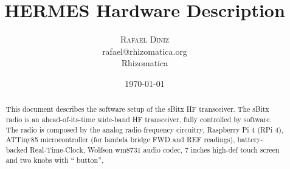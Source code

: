 \documentclass[11pt,a4paper]{article}
\title{HERMES Hardware Description}
\author{
       \large
        \textsc{Rafael Diniz}
        \mbox{}\\ %
        rafael@rhizomatica.org\\
        \mbox{Rhizomatica} \\ %
}
\date{\today}
\begin{document}
\maketitle

\begin{abstract}
  This document describes the software setup of the sBitx HF transceiver.
  The sBitx radio is an ahead-of-its-time wide-band HF transceiver, fully
  controlled by software. The radio is composed by the analog radio-frequency circuitry,
  Raspberry Pi 4 (RPi 4), ATTiny85 microcontroller (for lambda bridge FWD and REF readings), battery-backed
  Real-Time-Clock, Wolfson wm8731 audio codec, 7 inches high-def touch screen and two knobs with `` button'',
\end{abstract}

\newpage

\tableofcontents


\end{document}
